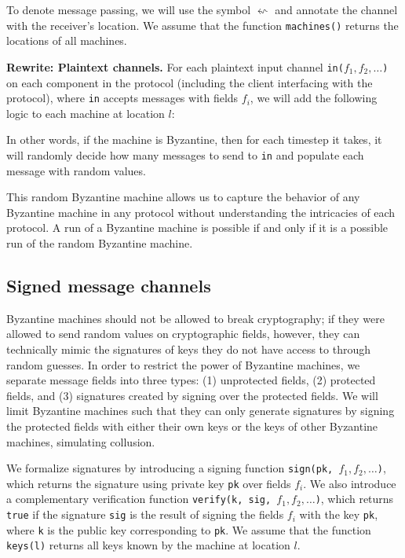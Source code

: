 To denote message passing, we will use the symbol $\leftsquigarrow$ and annotate the channel with the receiver's location.
We assume that the function \texttt{machines()} returns the locations of all machines.

\textbf{Rewrite: Plaintext channels.} For each plaintext input channel \texttt{in($f_1, f_2, \ldots$)} on each component in the protocol (including the client interfacing with the protocol), where \texttt{in} accepts messages with fields $f_i$, we will add the following logic to each machine at location $l$:
\begin{algorithmic}
        \EndFor
    \EndFor
\EndIf
\end{algorithmic}

In other words, if the machine is Byzantine, then for each timestep it takes, it will randomly decide how many messages to send to \texttt{in} and populate each message with random values.

This random Byzantine machine allows us to capture the behavior of any Byzantine machine in any protocol without understanding the intricacies of each protocol.
A run of a Byzantine machine is possible if and only if it is a possible run of the random Byzantine machine.

\subsection{Signed message channels}
\label{sec:signed-channels-formalism}
Byzantine machines should not be allowed to break cryptography; if they were allowed to send random values on cryptographic fields, however, they can technically mimic the signatures of keys they do not have access to through random guesses.
In order to restrict the power of Byzantine machines, we separate message fields into three types:
(1) unprotected fields,
(2) protected fields, and
(3) signatures created by signing over the protected fields.
We will limit Byzantine machines such that they can only generate signatures by signing the protected fields with either their own keys or the keys of other Byzantine machines, simulating collusion.

We formalize signatures by introducing a signing function \texttt{sign(pk, $f_1, f_2, \ldots$)}, which returns the signature using private key \texttt{pk} over fields $f_i$.
We also introduce a complementary verification function \texttt{verify(k, sig, $f_1, f_2, \ldots$)}, which returns \texttt{true} if the signature \texttt{sig} is the result of signing the fields $f_i$ with the key \texttt{pk}, where \texttt{k} is the public key corresponding to \texttt{pk}.
We assume that the function \texttt{keys(l)} returns all keys known by the machine at location $l$.

